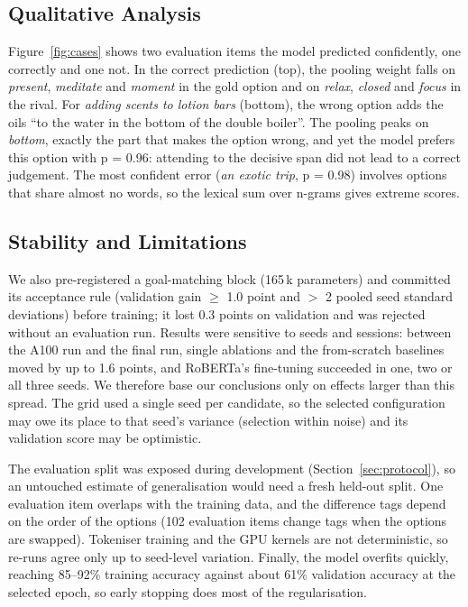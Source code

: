 \documentclass[11pt]{article}
\begin{document}
\subsection{Qualitative Analysis}
Figure~\ref{fig:cases} shows two evaluation items the model predicted confidently, one correctly and one not. In the correct prediction (top), the pooling weight falls on \emph{present}, \emph{meditate} and \emph{moment} in the gold option and on \emph{relax}, \emph{closed} and \emph{focus} in the rival. For \emph{adding scents to lotion bars} (bottom), the wrong option adds the oils ``to the water in the bottom of the double boiler''. The pooling peaks on \emph{bottom}, exactly the part that makes the option wrong, and yet the model prefers this option with p = 0.96: attending to the decisive span did not lead to a correct judgement. The most confident error (\emph{an exotic trip}, p = 0.98) involves options that share almost no words, so the lexical sum over n-grams gives extreme scores.

\subsection{Stability and Limitations}\label{sec:limits}
We also pre-registered a goal-matching block (165\,k parameters) and committed its acceptance rule (validation gain $\geq$ 1.0 point and $>$ 2 pooled seed standard deviations) before training; it lost 0.3 points on validation and was rejected without an evaluation run. Results were sensitive to seeds and sessions: between the A100 run and the final run, single ablations and the from-scratch baselines moved by up to 1.6 points, and RoBERTa's fine-tuning succeeded in one, two or all three seeds. We therefore base our conclusions only on effects larger than this spread. The grid used a single seed per candidate, so the selected configuration may owe its place to that seed's variance (selection within noise) and its validation score may be optimistic.

The evaluation split was exposed during development (Section~\ref{sec:protocol}), so an untouched estimate of generalisation would need a fresh held-out split. One evaluation item overlaps with the training data, and the difference tags depend on the order of the options (102 evaluation items change tags when the options are swapped). Tokeniser training and the GPU kernels are not deterministic, so re-runs agree only up to seed-level variation. Finally, the model overfits quickly, reaching 85--92\% training accuracy against about 61\% validation accuracy at the selected epoch, so early stopping does most of the regularisation.
\end{document}

